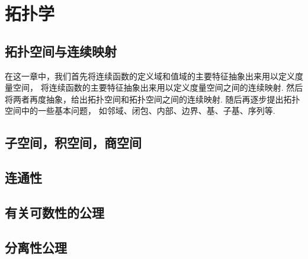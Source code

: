\part{拓扑学}
\chapter{拓扑空间与连续映射}


在这一章中，我们首先将连续函数的定义域和值域的主要特征抽象出来用以定义度量空间，
将连续函数的主要特征抽象出来用以定义度量空间之间的连续映射.
然后将两者再度抽象，给出拓扑空间和拓扑空间之间的连续映射.
随后再逐步提出拓扑空间中的一些基本问题，
如邻域、闭包、内部、边界、基、子基、序列等.



\begingroup
\def\T{\mathfrak T}%
\def\oT{\overline{\T}}%





\def\B{\mathscr{B}}%




\chapter{子空间，积空间，商空间}

\chapter{连通性}

\chapter{有关可数性的公理}

\chapter{分离性公理}

